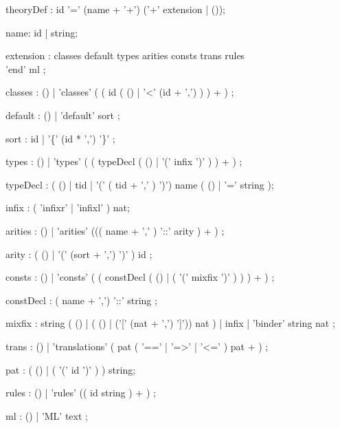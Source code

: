 \begin{rail}

theoryDef : id '=' (name + '+') ('+' extension | ());

name: id | string;

extension : classes default types arities consts trans rules \\ 'end' ml
          ;

classes : ()
        | 'classes' ( ( id (  ()
                            | '<' (id + ',')
                           ) 
                       ) + )
        ;

default : ()
        | 'default' sort 
        ;

sort :  id
     | '\{' (id * ',') '\}'
     ;

types :  ()
      | 'types' ( ( typeDecl ( () | '(' infix ')' ) ) + )
      ;

typeDecl : ( () | tid | '(' ( tid + ',' ) ')') name ( () | '='  string );

infix : ( 'infixr' | 'infixl' ) nat;


arities :  ()
        | 'arities' ((( name + ',' ) '::' arity ) + )
        ;

arity   : ( () 
          | '(' (sort + ',') ')' 
          ) id
        ;


consts :  ()
       | 'consts' ( ( constDecl ( () | ( '(' mixfix ')' ) ) ) + )
       ;

constDecl : ( name + ',') '::' string ;


mixfix :  string ( () | ( () | ('[' (nat + ',') ']')) nat )
       | infix
       | 'binder' string nat ;

trans : ()
      | 'translations' ( pat ( '==' | '=>' | '<=' ) pat + )
      ;

pat : ( () | ( '(' id ')' ) ) string;

rules :  ()
      | 'rules' (( id string ) + )
      ;

ml :  ()
   | 'ML' text
   ;

\end{rail}
